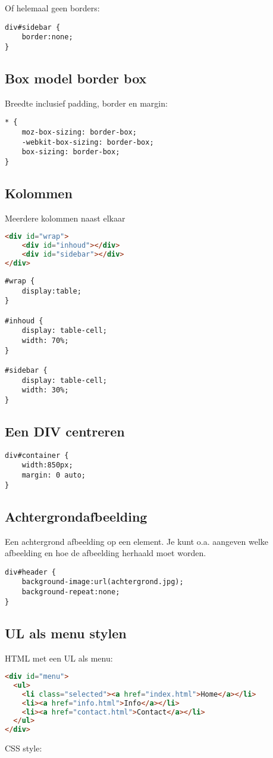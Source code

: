 \documentclass[8pt,pagesize,footinclude=false,headinclude=false]{scrartcl}
\begin{document}
\begin{multicols*}{4}
\noindent Of helemaal geen borders:

\begin{lstlisting}
div#sidebar {
	border:none;
}
\end{lstlisting}

\subsection*{Box model border box}
Breedte inclusief padding, border en margin:
\begin{lstlisting}
* { 
	moz-box-sizing: border-box; 
	-webkit-box-sizing: border-box; 
	box-sizing: border-box;
}
\end{lstlisting}

\subsection*{Kolommen}
Meerdere kolommen naast elkaar
\begin{lstlisting}[language=HTML]
<div id="wrap">
	<div id="inhoud"></div>
	<div id="sidebar"></div>
</div>
\end{lstlisting}

\begin{lstlisting}
#wrap {
	display:table;
}

#inhoud {
	display: table-cell;
	width: 70%;
}

#sidebar {
	display: table-cell;
	width: 30%;
}
\end{lstlisting}

\subsection*{Een DIV centreren}
\begin{lstlisting}
div#container {
	width:850px;
	margin: 0 auto;
}
\end{lstlisting}

\subsection*{Achtergrondafbeelding}
Een achtergrond afbeelding op een element. Je kunt o.a. aangeven welke afbeelding en hoe de afbeelding herhaald moet worden.
\begin{lstlisting}
div#header {
	background-image:url(achtergrond.jpg);
	background-repeat:none;
}
\end{lstlisting}

\subsection*{UL als menu stylen}
HTML met een UL als menu:
\begin{lstlisting}[language=HTML]
<div id="menu"> 
  <ul>
	<li class="selected"><a href="index.html">Home</a></li>
    <li><a href="info.html">Info</a></li>
    <li><a href="contact.html">Contact</a></li>
  </ul>
</div>
\end{lstlisting}
CSS style:



\end{multicols*}
\end{document}
